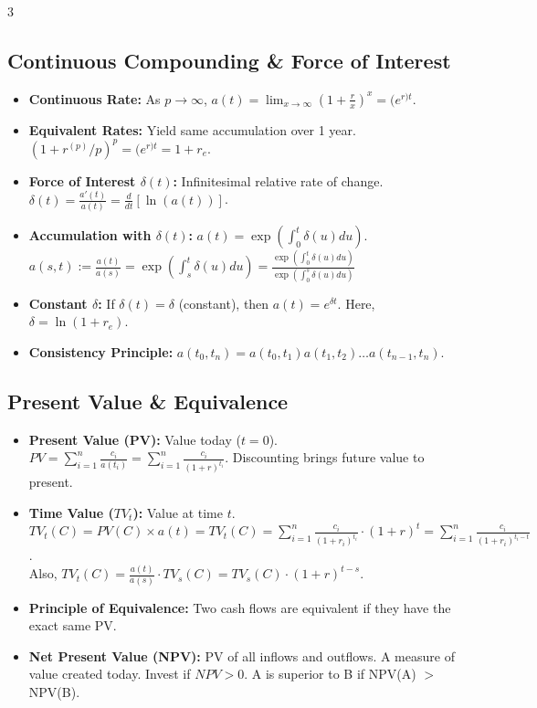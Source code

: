 \documentclass[8pt,a4paper,landscape]{extarticle}
\begin{document}
\begin{multicols*}{3}
    \subsection{Continuous Compounding \& Force of Interest}
    \begin{itemize}
        \item \textbf{Continuous Rate:} As $p \to \infty$, $a(t) = \lim_{x \to \infty} \left(1 + \frac{r}{x}\right)^x = (e^{r)t}$.
        \item \textbf{Equivalent Rates:} Yield same accumulation over 1 year. \linebreak $(1 + r^{(p)}/p)^p = (e^{r)t} = 1 + r_e$.
        \item \textbf{Force of Interest $\delta(t)$:} Infinitesimal relative rate of change. $\delta(t) = \frac{a'(t)}{a(t)} = \frac{d}{dt}[\ln(a(t))]$.
        \item \textbf{Accumulation with $\delta(t)$:} $a(t) = \exp(\int_0^t \delta(u) du)$.
              \\ $a(s, t) := \frac{a(t)}{a(s)} = \exp \left( \int_{s}^{t} \delta(u) du \right) = \frac{\exp \left( \int_{0}^{t} \delta(u) du \right)}{\exp \left( \int_{0}^{s} \delta(u) du \right)}$
        \item \textbf{Constant $\delta$:} If $\delta(t) = \delta$ (constant), then $a(t) = e^{\delta t}$. Here, $\delta = \ln(1+r_e)$.
        \item \textbf{Consistency Principle:} $a(t_0, t_n) = a(t_0, t_1)a(t_1, t_2) \dots a(t_{n-1}, t_n)$.
    \end{itemize}

    \subsection{Present Value \& Equivalence}
    \begin{itemize}
        \item \textbf{Present Value (PV):} Value today ($t=0$). \\$PV = \sum_{i=1}^n \frac{c_i}{a(t_i)} = \sum_{i=1}^n \frac{c_i}{(1+r)^{t_i}}$. Discounting brings future value to present.
        \item \textbf{Time Value ($TV_t$):} Value at time $t$. $TV_t(C) = PV(C) \times a(t) = TV_t(C) = \sum_{i=1}^n \frac{c_i}{(1 + r_i)^{t_i}} \cdot (1 + r)^{t} = \sum_{i=1}^n \frac{c_i}{(1 + r_i)^{t_i - t}}$. \\ Also, $TV_t(C) = \frac{a(t)}{a(s)} \cdot TV_s(C) = TV_s(C) \cdot (1 + r)^{t - s}$.
        \item \textbf{Principle of Equivalence:} Two cash flows are equivalent if they have the exact same PV.
        \item \textbf{Net Present Value (NPV):} PV of all inflows and outflows. A measure of value created today. Invest if $NPV > 0$. A is superior to B if NPV(A) $>$ NPV(B).
    \end{itemize}


\end{multicols*}
\end{document}

